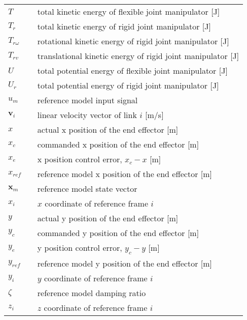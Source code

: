 \begin{longtable}[ht]{lll}
			$T$															&  & total kinetic energy of flexible joint manipulator [J]\\
			$T_{r}$													&  & total kinetic energy of rigid joint manipulator [J]\\
			$T_{r\omega}$										&  & rotational kinetic energy of rigid joint manipulator [J]\\
			$T_{rv}$												&  & translational kinetic energy of rigid joint manipulator [J]\\
			$U$															&  & total potential energy of flexible joint manipulator [J]\\
			$U_{r}$													&  & total potential energy of rigid joint manipulator [J]\\
			$u_{m}$													&  & reference model input signal\\
			$\mathbf{v}_{i}$								&  & linear velocity vector of link $i$ [m/s]\\
			$x$															&  & actual x position of the end effector [m]\\
			$x_{c}$													&  & commanded x position of the end effector [m]\\
			$x_{e}$													&  & x position control error, $x_{c}-x$ [m]\\
			$x_{ref}$												&  & reference model x position of the end effector [m]\\
			$\mathbf{x}_{m}$								&  & reference model state vector\\
			$x_{i}$													&  & $x$ coordinate of reference frame $i$\\
			$y$															&  & actual y position of the end effector [m]\\
			$y_{c}$													&  & commanded y position of the end effector [m]\\
			$y_{e}$													&  & y position control error, $y_{c}-y$ [m]\\
			$y_{ref}$												&  & reference model y position of the end effector [m]\\
			$y_{i}$													&  & $y$ coordinate of reference frame $i$\\
			$\zeta$													&  & reference model damping ratio\\
			$z_{i}$													&  & $z$ coordinate of reference frame $i$\\
\end{longtable}